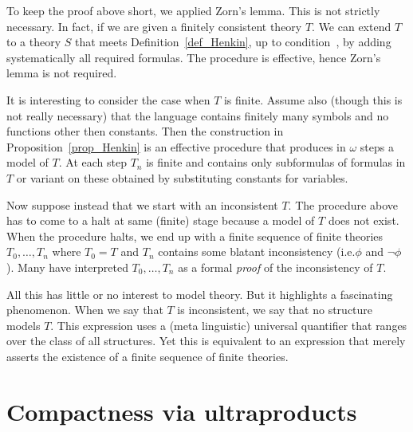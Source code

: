 \documentclass[creche.tex]{subfiles}
\begin{document}
\begin{remark}
To keep the proof above short, we applied Zorn's lemma. This is not strictly necessary. In fact, if we are given a finitely consistent theory $T$. We can extend $T$ to a theory $S$ that meets Definition~\ref{def_Henkin}, up to condition~, by adding systematically all required formulas. The procedure is effective, hence Zorn's lemma is not required. 

It is interesting to consider the case when $T$ is finite. Assume also (though this is not really necessary) that the language contains finitely many symbols and no functions other then constants. Then the construction in Proposition~\ref{prop_Henkin} is an effective procedure that produces in $\omega$ steps a model of $T$. At each step $T_n$ is finite and contains only subformulas of formulas in $T$ or variant on these obtained by substituting constants for variables.

Now suppose instead that we start with an inconsistent $T$. The procedure above has to come to a halt at same (finite) stage because a model of $T$ does not exist. When the procedure halts, we end up with a finite sequence of finite theories $T_0,\dots, T_n$ where $T_0=T$ and $T_n$ contains some blatant inconsistency (i.e.\@ $\phi$ and $\neg\phi$). Many have interpreted  $T_0,\dots, T_n$ as a formal \textit{proof\/} of the inconsistency of $T$.

All this has little or no interest to model theory. But it highlights a fascinating phenomenon.  When we say that $T$ is inconsistent, we say that no structure models $T$. This expression uses a (meta linguistic) universal quantifier that ranges over the class of all structures. Yet this is equivalent to an expression that merely asserts the existence of a finite sequence of finite theories.\QED
\end{remark}

\section{Compactness via ultraproducts}\label{compactness_Ultra}
\def\medrel#1{\parbox[t]{6ex}{$\displaystyle\hfil #1$}}
\def\ceq#1#2#3{\parbox{25ex}{$\displaystyle #1$}\medrel{#2}$\displaystyle  #3$}
\end{document}
